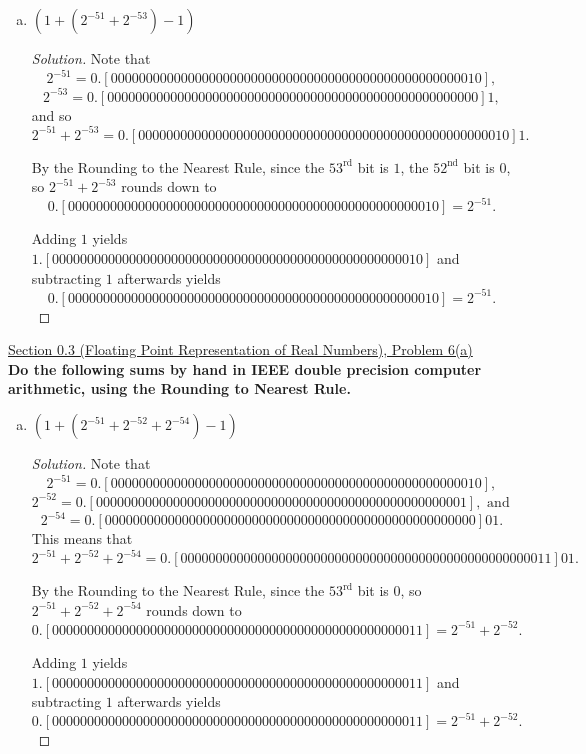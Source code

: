 \documentclass[11pt]{article}
\newenvironment{solution}
  {\renewcommand\qedsymbol{$\blacksquare$}\begin{proof}[Solution]}
  {\end{proof}}
\theoremstyle{definition}
\begin{document}
\begin{enumerate}[a)] 
    \item $(1 + (2^{-51} + 2^{-53}) - 1)$

    \begin{solution}
    Note that \[2^{-51} = 0.[00000000000000000000000000000000000000000000000000010],\] \[2^{-53} = 0.[00000000000000000000000000000000000000000000000000000]1,\] 
    and so \[ 2^{-51} + 2^{-53} = 0.[00000000000000000000000000000000000000000000000000010]1.\]

    By the Rounding to the Nearest Rule, since the $53^{\text{rd}}$ bit is $1$, the $52^{\text{nd}}$ bit is $0$, so $2^{-51} + 2^{-53}$ rounds down to
    \[0.[00000000000000000000000000000000000000000000000000010] = 2^{-51}.\]

    Adding $1$ yields $1.[00000000000000000000000000000000000000000000000000010]$ and subtracting $1$ afterwards yields
    \[ \boxed{0.[00000000000000000000000000000000000000000000000000010] = 2^{-51}}.\]
    \end{solution}
\end{enumerate}



\underline{Section 0.3 (Floating Point Representation of Real Numbers), Problem 6(a)} \\

\textbf{Do the following sums by hand in IEEE double precision computer arithmetic, using the Rounding to Nearest Rule.}

\begin{enumerate}[a)] 
    \item $(1 + (2^{-51} + 2^{-52} + 2^{-54}) - 1)$
    \begin{solution}
        Note that \[2^{-51} = 0.[00000000000000000000000000000000000000000000000000010],\] \[2^{-52} = 0.[00000000000000000000000000000000000000000000000000001], \text{ and }\] 
        \[ 2^{-54} = 0.[00000000000000000000000000000000000000000000000000000]01.\]
        This means that \[ 2^{-51} + 2^{-52} + 2^{-54}= 0.[00000000000000000000000000000000000000000000000000011]01.\]
    
        By the Rounding to the Nearest Rule, since the $53^{\text{rd}}$ bit is $0$, so $2^{-51} + 2^{-52} + 2^{-54}$ rounds down to
        \[0.[00000000000000000000000000000000000000000000000000011] = 2^{-51} + 2^{-52}.\]
    
        Adding $1$ yields $1.[00000000000000000000000000000000000000000000000000011]$ and subtracting $1$ afterwards yields
        \[ \boxed{0.[00000000000000000000000000000000000000000000000000011] = 2^{-51} + 2^{-52}}.\]
        \end{solution}

\end{enumerate}
\end{document}
